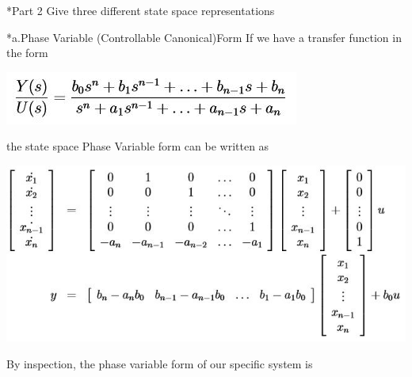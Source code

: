 \documentclass[paper=a4, fontsize=11pt]{scrartcl} %
\numberwithin{equation}{section} %
\numberwithin{figure}{section} %
\numberwithin{table}{section} %
\begin{document}
\begin{section}*{Part 2}
Give three different state space representations
\begin{subsection}*{a.Phase Variable (Controllable Canonical)Form}
If we have a transfer function in the form
\begin{center}
\includegraphics{Image2}
\end{center}
the state space Phase Variable form can be written as
\begin{center}
\includegraphics{Image3}
\end{center}
By inspection, the phase variable form of our specific system is


\end{subsection}
\end{section}
\end{document}
